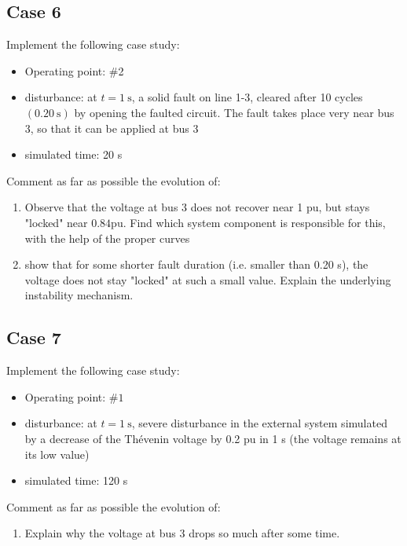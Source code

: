 \documentclass[a4paper,11pt,oneside,onecolumn]{article}
\begin{document}
\subsection{Case 6}

Implement the following case study:
\begin{itemize}
\item Operating point: \#2
\item disturbance: at $t=1 \mathrm{~s}$, a solid fault on line 1-3, cleared after 10 cycles $(0.20 \mathrm{~s})$ by opening the faulted circuit. The fault takes place very near bus 3, so that it can be applied at bus 3
\item simulated time: 20 s 
\end{itemize}

\noindent Comment as far as possible the evolution of:
\begin{enumerate}
\item Observe that the voltage at bus 3 does not recover near 1 pu, but stays "locked" near $0.84 \mathrm{pu}$. Find which system component is responsible for this, with the help of the proper curves
\item show that for some shorter fault duration (i.e. smaller than 0.20 s), the voltage does not stay "locked" at such a small value. Explain the underlying instability mechanism.	
\end{enumerate}

\subsection{Case 7}

Implement the following case study:
\begin{itemize}
\item Operating point: $\# 1$
\item disturbance: at $t=1 \mathrm{~s}$, severe disturbance in the external system simulated by a decrease of the Thévenin voltage by 0.2 pu in 1 s (the voltage remains at its low value)
\item simulated time: 120 s
\end{itemize}

\noindent Comment as far as possible the evolution of:
\begin{enumerate}
\item Explain why the voltage at bus 3 drops so much after some time.
\end{enumerate}
\end{document}
